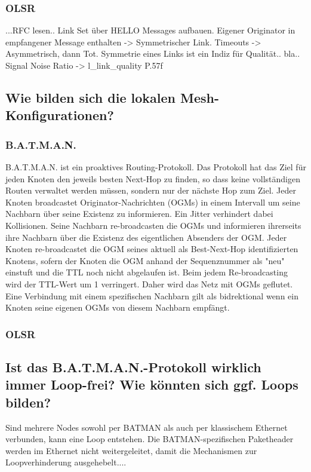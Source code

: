 \documentclass[a4paper,10pt]{article}
\begin{document}
\subsubsection*{OLSR}

...RFC lesen..
Link Set über HELLO Messages aufbauen. Eigener Originator in empfangener Message enthalten -> Symmetrischer Link. Timeouts -> Asymmetrisch, dann Tot.
Symmetrie eines Links ist ein Indiz für Qualität.. bla..
Signal Noise Ratio -> l\_link\_quality P.57f

\subsection{Wie bilden sich die lokalen Mesh-Konfigurationen?}


\subsubsection*{B.A.T.M.A.N.}

B.A.T.M.A.N. ist ein proaktives Routing-Protokoll.
Das Protokoll hat das Ziel für jeden Knoten den jeweils besten Next-Hop zu finden, so dass keine vollständigen Routen verwaltet werden müssen, sondern nur der nächste Hop zum Ziel.
Jeder Knoten broadcastet Originator-Nachrichten (OGMs) in einem Intervall um seine Nachbarn über seine Existenz zu informieren.
Ein Jitter verhindert dabei Kollisionen.
Seine Nachbarn re-broadcasten die OGMs und informieren ihrerseits ihre Nachbarn über die Existenz des eigentlichen Absenders der OGM.
Jeder Knoten re-broadcastet die OGM seines aktuell als Best-Next-Hop identifizierten Knotens, sofern der Knoten die OGM anhand der Sequenznummer als "neu" einstuft und die TTL noch nicht abgelaufen ist.
Beim jedem Re-broadcasting wird der TTL-Wert um 1 verringert.
Daher wird das Netz mit OGMs geflutet.
Eine Verbindung mit einem spezifischen Nachbarn gilt als bidrektional wenn ein Knoten seine eigenen OGMs von diesem Nachbarn empfängt.


\subsubsection*{OLSR}

\subsection{Ist das B.A.T.M.A.N.-Protokoll wirklich immer Loop-frei? Wie könnten sich ggf. Loops bilden?}
Sind mehrere Nodes sowohl per BATMAN als auch per klassischem Ethernet verbunden, kann eine Loop entstehen. Die BATMAN-spezifischen Paketheader werden im Ethernet nicht weitergeleitet, damit die Mechanismen zur Loopverhinderung ausgehebelt....
\end{document}
